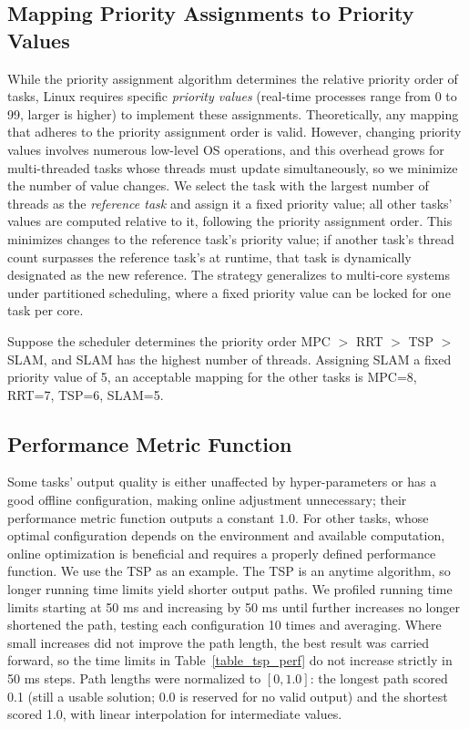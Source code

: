     \subsection{Mapping Priority Assignments to Priority Values}
    \label{section_pa_values}
    While the priority assignment algorithm determines the relative priority order of tasks, Linux requires specific \textit{priority values} (real-time processes range from 0 to 99, larger is higher) to implement these assignments.
    Theoretically, any mapping that adheres to the priority assignment order is valid.
    However, changing priority values involves numerous low-level OS operations, and this overhead grows for multi-threaded tasks whose threads must update simultaneously, so we minimize the number of value changes.
    We select the task with the largest number of threads as the \textit{reference task} and assign it a fixed priority value; all other tasks' values are computed relative to it, following the priority assignment order.
    This minimizes changes to the reference task's priority value; if another task's thread count surpasses the reference task's at runtime, that task is dynamically designated as the new reference.
    The strategy generalizes to multi-core systems under partitioned scheduling, where a fixed priority value can be locked for one task per core.

    \begin{Example}
    Suppose the scheduler determines the priority order MPC $>$ RRT $>$ TSP $>$ SLAM, and SLAM has the highest number of threads.
    Assigning SLAM a fixed priority value of 5, an acceptable mapping for the other tasks is MPC=8, RRT=7, TSP=6, SLAM=5.
    \end{Example}

    \subsection{Performance Metric Function}
    \label{section_generate_tsp_perf}
    Some tasks' output quality is either unaffected by hyper-parameters or has a good offline configuration, making online adjustment unnecessary; their performance metric function outputs a constant $1.0$.
    For other tasks, whose optimal configuration depends on the environment and available computation, online optimization is beneficial and requires a properly defined performance function.
    We use the TSP as an example.
    The TSP is an anytime algorithm, so longer running time limits yield shorter output paths.
    We profiled running time limits starting at 50 ms and increasing by 50 ms until further increases no longer shortened the path, testing each configuration 10 times and averaging.
    Where small increases did not improve the path length, the best result was carried forward, so the time limits in Table~\ref{table_tsp_perf} do not increase strictly in 50 ms steps.
    Path lengths were normalized to $[0, 1.0]$: the longest path scored 0.1 (still a usable solution; 0.0 is reserved for no valid output) and the shortest scored 1.0, with linear interpolation for intermediate values.

